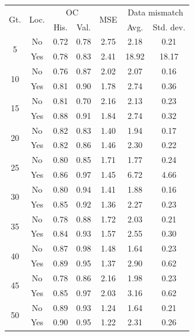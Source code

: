\begin{tabular}{ccccccc}
\toprule
\multirow{2}{*}{
    Gt.
}
&
\multirow{2}{*}{Loc.} 
& 
\multicolumn{2}{c}{OC} & 
\multirow{2}{*}{
    MSE
} & 
\multicolumn{2}{c}{Data mismatch} 
\\
& & His. & Val. &  & Avg. & Std. dev.
\\
\midrule
\multirow{2}{*}{5} & No & 0.72 & 0.78 & 2.75 & 2.18 & 0.21 \\
 & Yes & 0.78 & 0.83 & 2.41 & 18.92 & 18.17 \\
\midrule
\multirow{2}{*}{10} & No & 0.76 & 0.87 & 2.02 & 2.07 & 0.16 \\
 & Yes & 0.81 & 0.90 & 1.78 & 2.74 & 0.36 \\
\midrule
\multirow{2}{*}{15} & No & 0.81 & 0.70 & 2.16 & 2.13 & 0.23 \\
 & Yes & 0.88 & 0.91 & 1.84 & 2.74 & 0.32 \\
\midrule
\multirow{2}{*}{20} & No & 0.82 & 0.83 & 1.40 & 1.94 & 0.17 \\
 & Yes & 0.82 & 0.86 & 1.46 & 2.30 & 0.22 \\
\midrule
\multirow{2}{*}{25} & No & 0.80 & 0.85 & 1.71 & 1.77 & 0.24 \\
 & Yes & 0.86 & 0.97 & 1.45 & 6.72 & 4.66 \\
\midrule
\multirow{2}{*}{30} & No & 0.80 & 0.94 & 1.41 & 1.88 & 0.16 \\
 & Yes & 0.85 & 0.92 & 1.36 & 2.27 & 0.23 \\
\midrule
\multirow{2}{*}{35} & No & 0.78 & 0.88 & 1.72 & 2.03 & 0.21 \\
 & Yes & 0.84 & 0.93 & 1.57 & 2.55 & 0.30 \\
\midrule
\multirow{2}{*}{40} & No & 0.87 & 0.98 & 1.48 & 1.64 & 0.23 \\
 & Yes & 0.89 & 0.95 & 1.37 & 2.90 & 0.62 \\
\midrule
\multirow{2}{*}{45} & No & 0.78 & 0.86 & 2.16 & 1.98 & 0.23 \\
 & Yes & 0.85 & 0.97 & 2.03 & 3.16 & 0.62 \\
\midrule
\multirow{2}{*}{50} & No & 0.89 & 0.93 & 1.24 & 1.64 & 0.21 \\
 & Yes & 0.90 & 0.95 & 1.22 & 2.31 & 0.26 \\
\bottomrule
\end{tabular}

